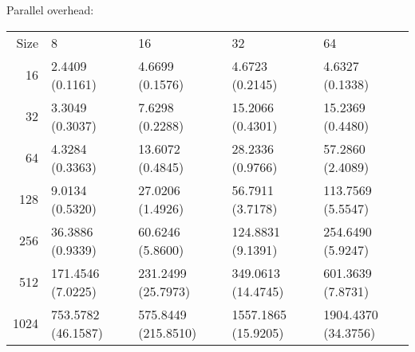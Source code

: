 \documentclass{article}
\begin{document}
Parallel overhead:



\begin{center}
\begin{tabular}{rllll}
 Size  &  8                   &  16                   &  32                   &  64                   \\
   16  &  2.4409 (0.1161)     &  4.6699 (0.1576)      &  4.6723 (0.2145)      &  4.6327 (0.1338)      \\
   32  &  3.3049 (0.3037)     &  7.6298 (0.2288)      &  15.2066 (0.4301)     &  15.2369 (0.4480)     \\
   64  &  4.3284 (0.3363)     &  13.6072 (0.4845)     &  28.2336 (0.9766)     &  57.2860 (2.4089)     \\
  128  &  9.0134 (0.5320)     &  27.0206 (1.4926)     &  56.7911 (3.7178)     &  113.7569 (5.5547)    \\
  256  &  36.3886 (0.9339)    &  60.6246 (5.8600)     &  124.8831 (9.1391)    &  254.6490 (5.9247)    \\
  512  &  171.4546 (7.0225)   &  231.2499 (25.7973)   &  349.0613 (14.4745)   &  601.3639 (7.8731)    \\
 1024  &  753.5782 (46.1587)  &  575.8449 (215.8510)  &  1557.1865 (15.9205)  &  1904.4370 (34.3756)  \\
\end{tabular}
\end{center}
\end{document}
